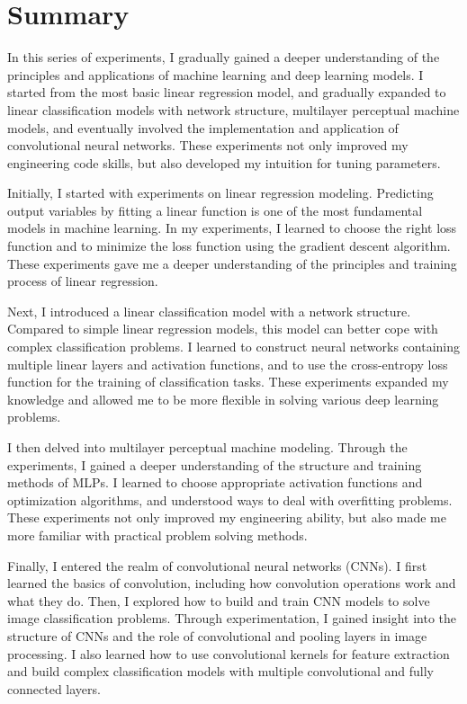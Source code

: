 \documentclass[a4paper,12pt]{article}
\begin{document}
\newpage

\section*{Summary}
In this series of experiments, I gradually gained a deeper understanding of the principles and applications of machine learning and deep learning models. I started from the most basic linear regression model, and gradually expanded to linear classification models with network structure, multilayer perceptual machine models, and eventually involved the implementation and application of convolutional neural networks. These experiments not only improved my engineering code skills, but also developed my intuition for tuning parameters.

Initially, I started with experiments on linear regression modeling. Predicting output variables by fitting a linear function is one of the most fundamental models in machine learning. In my experiments, I learned to choose the right loss function and to minimize the loss function using the gradient descent algorithm. These experiments gave me a deeper understanding of the principles and training process of linear regression.

Next, I introduced a linear classification model with a network structure. Compared to simple linear regression models, this model can better cope with complex classification problems. I learned to construct neural networks containing multiple linear layers and activation functions, and to use the cross-entropy loss function for the training of classification tasks. These experiments expanded my knowledge and allowed me to be more flexible in solving various deep learning problems.

I then delved into multilayer perceptual machine modeling. Through the experiments, I gained a deeper understanding of the structure and training methods of MLPs. I learned to choose appropriate activation functions and optimization algorithms, and understood ways to deal with overfitting problems. These experiments not only improved my engineering ability, but also made me more familiar with practical problem solving methods.

Finally, I entered the realm of convolutional neural networks (CNNs). I first learned the basics of convolution, including how convolution operations work and what they do. Then, I explored how to build and train CNN models to solve image classification problems. Through experimentation, I gained insight into the structure of CNNs and the role of convolutional and pooling layers in image processing. I also learned how to use convolutional kernels for feature extraction and build complex classification models with multiple convolutional and fully connected layers.
\end{document}
